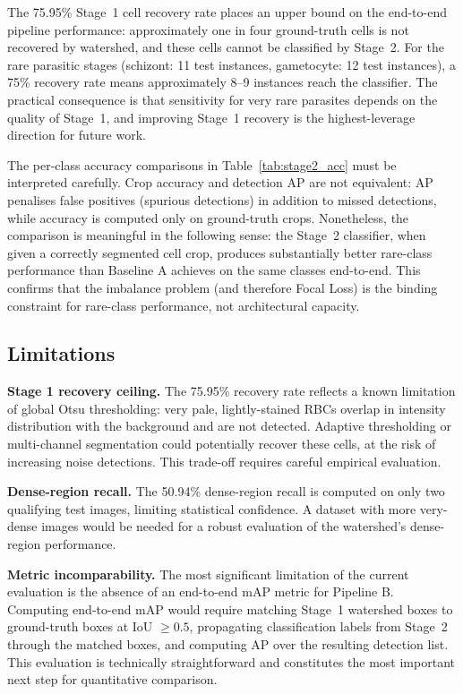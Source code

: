\documentclass[10pt,twocolumn]{article}
\begin{document}
The 75.95\% Stage~1 cell recovery rate places an upper bound on the
end-to-end pipeline performance: approximately one in four ground-truth
cells is not recovered by watershed, and these cells cannot be classified
by Stage~2. For the rare parasitic stages (schizont: 11 test instances,
gametocyte: 12 test instances), a 75\% recovery rate means approximately
8--9 instances reach the classifier. The practical consequence is that
sensitivity for very rare parasites depends on the quality of Stage~1,
and improving Stage~1 recovery is the highest-leverage direction for
future work.

The per-class accuracy comparisons in Table~\ref{tab:stage2_acc} must be
interpreted carefully. Crop accuracy and detection AP are not equivalent:
AP penalises false positives (spurious detections) in addition to missed
detections, while accuracy is computed only on ground-truth crops.
Nonetheless, the comparison is meaningful in the following sense: the
Stage~2 classifier, when given a correctly segmented cell crop, produces
substantially better rare-class performance than Baseline A achieves
on the same classes end-to-end. This confirms that the imbalance problem
(and therefore Focal Loss) is the binding constraint for rare-class
performance, not architectural capacity.

\subsection{Limitations}
\label{ssec:limits}

\textbf{Stage 1 recovery ceiling.} The 75.95\% recovery rate reflects a
known limitation of global Otsu thresholding: very pale, lightly-stained
RBCs overlap in intensity distribution with the background and are not
detected. Adaptive thresholding or multi-channel segmentation could
potentially recover these cells, at the risk of increasing noise detections.
This trade-off requires careful empirical evaluation.

\textbf{Dense-region recall.} The 50.94\% dense-region recall is
computed on only two qualifying test images, limiting statistical
confidence. A dataset with more very-dense images would be needed for
a robust evaluation of the watershed's dense-region performance.

\textbf{Metric incomparability.} The most significant limitation of the
current evaluation is the absence of an end-to-end mAP metric for
Pipeline B. Computing end-to-end mAP would require matching Stage~1
watershed boxes to ground-truth boxes at IoU $\geq 0.5$, propagating
classification labels from Stage~2 through the matched boxes, and computing
AP over the resulting detection list. This evaluation is technically
straightforward and constitutes the most important next step for quantitative
comparison.
\end{document}
